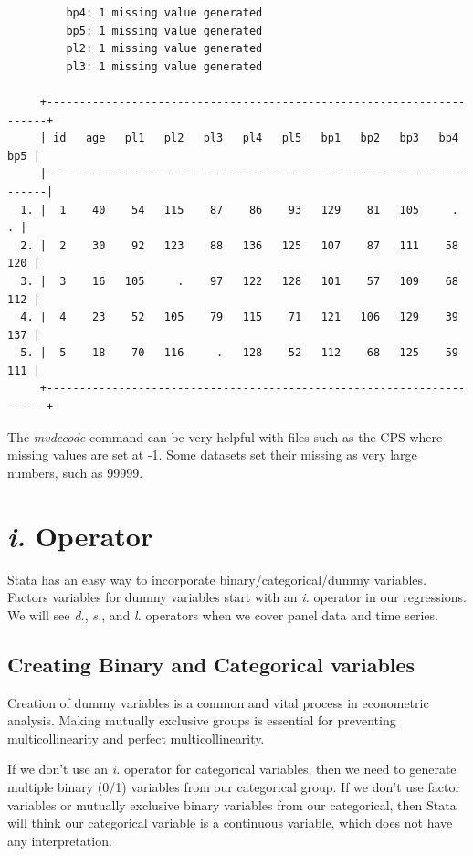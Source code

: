 \documentclass[
]{book}
\begin{document}
\begin{verbatim}
         bp4: 1 missing value generated
         bp5: 1 missing value generated
         pl2: 1 missing value generated
         pl3: 1 missing value generated

     +----------------------------------------------------------------------+
     | id   age   pl1   pl2   pl3   pl4   pl5   bp1   bp2   bp3   bp4   bp5 |
     |----------------------------------------------------------------------|
  1. |  1    40    54   115    87    86    93   129    81   105     .     . |
  2. |  2    30    92   123    88   136   125   107    87   111    58   120 |
  3. |  3    16   105     .    97   122   128   101    57   109    68   112 |
  4. |  4    23    52   105    79   115    71   121   106   129    39   137 |
  5. |  5    18    70   116     .   128    52   112    68   125    59   111 |
     +----------------------------------------------------------------------+
\end{verbatim}

The \emph{mvdecode} command can be very helpful with files such as the CPS where missing values are set at -1. Some datasets set their missing as very large numbers, such as 99999.

\section{\texorpdfstring{\emph{i.} Operator}{i. Operator}}\label{i.-operator}

Stata has an easy way to incorporate binary/categorical/dummy variables. Factors variables for dummy variables start with an \emph{i.} operator in our regressions. We will see \emph{d.}, \emph{s.}, and \emph{l.} operators when we cover panel data and time series.

\subsection{Creating Binary and Categorical variables}\label{creating-binary-and-categorical-variables}

Creation of dummy variables is a common and vital process in econometric analysis. Making mutually exclusive groups is essential for preventing multicollinearity and perfect multicollinearity.

If we don't use an \emph{i.} operator for categorical variables, then we need to generate multiple binary (0/1) variables from our categorical group. If we don't use factor variables or mutually exclusive binary variables from our categorical, then Stata will think our categorical variable is a continuous variable, which does not have any interpretation.
\end{document}
